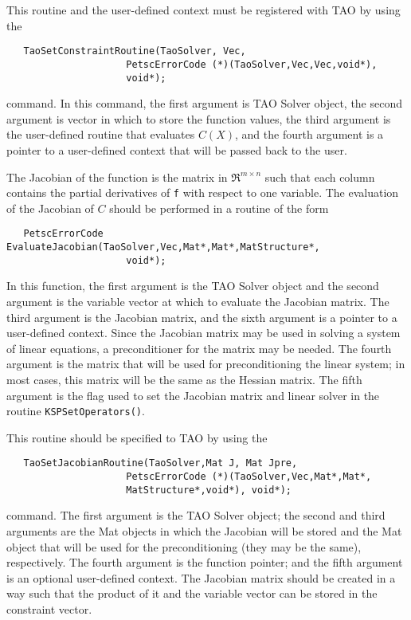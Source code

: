 This routine and the user-defined context 
must be registered with TAO by using the
\begin{verbatim}
   TaoSetConstraintRoutine(TaoSolver, Vec,
                     PetscErrorCode (*)(TaoSolver,Vec,Vec,void*),
                     void*);
\end{verbatim}
command. 
\noindent
In this command, the first argument is TAO Solver object,
the second argument is vector in which to store the function values,
the third argument is the user-defined routine that evaluates $C(X)$,
and the fourth argument is a pointer to a user-defined context that will
be passed back to the user.

The Jacobian of the function is the matrix in $\Re^{m \times n}$
such that each column contains the partial derivatives of {\tt f} with respect
to one variable. 
The evaluation of the Jacobian of $C$ should be performed in a routine
of the form
\begin{verbatim}
   PetscErrorCode EvaluateJacobian(TaoSolver,Vec,Mat*,Mat*,MatStructure*,
                     void*);
\end{verbatim}
\noindent
In this function, the first argument is the TAO Solver object and the 
second argument is the variable vector at which to evaluate the 
Jacobian matrix. The third argument is the Jacobian matrix,
and the sixth argument is a pointer to a user-defined context.
Since the Jacobian matrix may be used in solving a system of linear equations,
a preconditioner for the matrix may be needed.  The fourth argument is the matrix that will be used
for preconditioning the linear system; in most cases, this
matrix will be the same as the Hessian matrix.  The fifth
argument is the flag used to set the Jacobian matrix and
linear solver in the routine {\tt KSPSetOperators()}.

This routine should be specified to TAO by using the
\begin{verbatim}
   TaoSetJacobianRoutine(TaoSolver,Mat J, Mat Jpre,
                     PetscErrorCode (*)(TaoSolver,Vec,Mat*,Mat*, 
                     MatStructure*,void*), void*);
\end{verbatim}
\noindent
command.
The first argument is the TAO Solver object; the second
and third arguments are the Mat objects in which the Jacobian will be stored
and the Mat object that will be used for the preconditioning (they may
be the same), respectively. 
The fourth argument is the function pointer; and the fifth argument is
an optional user-defined context.
The Jacobian matrix should be created in a way such that the product of 
it and the variable vector can be stored in the constraint vector.




